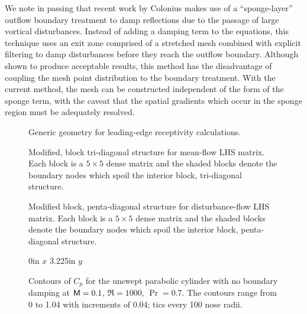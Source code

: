 We note in passing that recent work by Colonius \etal \cite{CoMoLe:95} makes
use of a ``sponge-layer'' outflow boundary treatment to damp reflections due
to the passage of large vortical disturbances.  Instead of adding a damping
term to the equations, this technique uses an exit zone comprised of a
stretched mesh combined with explicit filtering to damp disturbances before
they reach the outflow boundary.  Although shown to produce acceptable
results, this method has the disadvantage of coupling the mesh point
distribution to the boundary treatment.  With the current method, the mesh can
be constructed independent of the form of the sponge term, with the caveat that
the spatial gradients which occur in the sponge region must be adequately
resolved.
%
%

%
%
%
%
\begin{figure}[p]
\centering \epsfxsize=5.0in 
\caption {Generic geometry for leading-edge receptivity
calculations. \label{f:domain}}
\end{figure}
%
%
\begin{figure}[p]
\centering
\epsfxsize=4.0in 
\caption[Modified, block tri-diagonal matrix structure.] {Modified, block
tri-diagonal structure for mean-flow LHS matrix.  Each block is a $5 \times 5$
dense matrix and the shaded blocks denote the boundary nodes which spoil the
interior block, tri-diagonal structure. \label{f:tri}}
\end{figure}
%
\begin{figure}[p]
\centering
\epsfxsize=4.0in 
\caption[Modified block, penta-diagonal matrix structure] {Modified block,
penta-diagonal structure for disturbance-flow LHS matrix. Each block is a $5
\times 5$ dense matrix and the shaded blocks denote the boundary nodes which
spoil the interior block, penta-diagonal structure. \label{f:penta}}
\end{figure}
%
%
\begin{figure}[p]
\centering
\figlab 3.3in 0in {$x$}
\figlab -0.1in 3.225in {$y$}
\epsfxsize=3.25in 
\caption[Contours of $C_p$ with no boundary damping] {Contours of $C_p$ for the unswept
parabolic cylinder with no boundary damping at ${\sf M}=0.1$, $\Re=1000$,
$\Pr=0.7$.  The contours range from 0 to 1.04 with increments of 0.04; tics
every 100 nose radii. \label{f:M=0.1p3}}
\end{figure}
